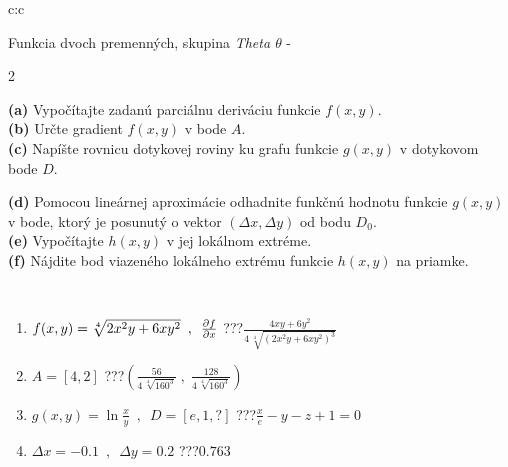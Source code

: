 \documentclass[10pt]{report}
\begin{document}
\begin{tabular}{c:c}
\begin{minipage}[c][104.5mm][t]{0.5\linewidth}
\begin{center}
\vspace{7mm}
{\huge \LARGE Funkcia dvoch premenných, skupina \textit{Theta $\theta$} -}\\[5mm]
\begin{minipage}{0.95\linewidth}
\begin{center}
{\small \begin{multicols}{2} \raggedright
\textbf{(a)} Vypočítajte zadanú parciálnu deriváciu funkcie \(f(x,y)\). \\[1mm]
\textbf{(b)} Určte gradient \(f(x,y)\) v bode \(A\). \\[1mm]
\textbf{(c)} Napíšte rovnicu dotykovej roviny ku grafu funkcie \(g(x,y)\) v dotykovom bode \(D\). \par \columnbreak
\textbf{(d)} Pomocou lineárnej aproximácie odhadnite funkčnú hodnotu funkcie \(g(x,y)\) v bode, ktorý je posunutý o vektor \((\Delta x, \Delta y)\) od bodu \(D_0\). \\[1mm]
\textbf{(e)} Vypočítajte \(h(x,y)\) v jej lokálnom extréme. \\[1mm]
\textbf{(f)} Nájdite bod viazeného lokálneho extrému funkcie \(h(x,y)\) na priamke. \\[1mm]
\end{multicols}
}
\end{center}
\end{minipage}
\\[4mm]
\begin{minipage}{0.79\linewidth}
\begin{center}
\begin{varwidth}{\linewidth}
\begin{enumerate}
\normalsizerr
\item $f(x,y) = \sqrt[4]{2x^2y + 6xy^2}\enspace , \enspace \pdv{f}{x}$\quad \dotfill\; ???\;\dotfill \quad $\frac{4xy+6y^2}{4\,\sqrt[4]{(2x^2y+6xy^2)^{3}}}$
\item $A = [4, 2]$\quad \dotfill\; ???\;\dotfill \quad $\left( \frac{56}{4\,\sqrt[4]{160^3}} \;,\; \frac{128}{4\,\sqrt[4]{160^3}} \right)$
\item $g(x,y) = \ln\frac{x}{y} \enspace , \enspace D=[e,1,?]$\quad \dotfill\; ???\;\dotfill \quad $\frac{x}{e} - y - z + 1 = 0$
\item $\Delta x = {-0.1} \enspace,\enspace \Delta y = {0.2}$\quad \dotfill\; ???\;\dotfill \quad $0.763$

\end{enumerate}
\end{varwidth}
\end{center}
\end{minipage}
\end{center}
\end{minipage}
\end{tabular}
\end{document}
